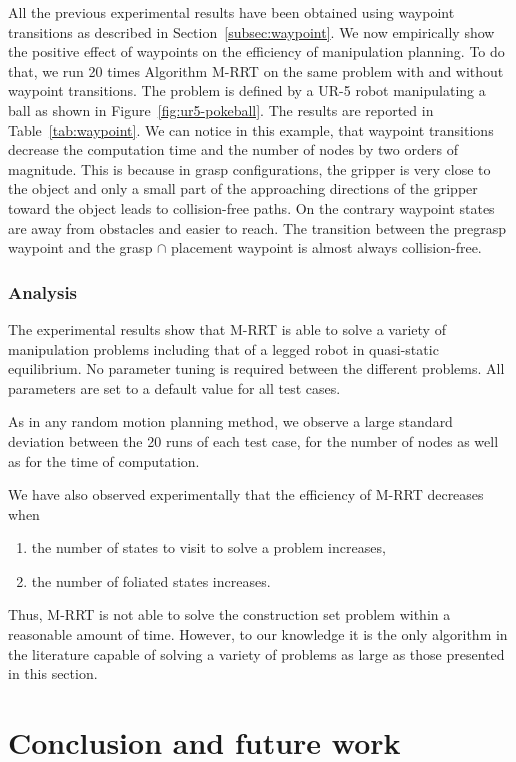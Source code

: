 All the previous experimental results have been obtained using
waypoint transitions as described in Section~\ref{subsec:waypoint}. We
now empirically show the positive effect of waypoints on the
efficiency of manipulation planning. To do that, we run 20 times
Algorithm M-RRT on the same problem with and without waypoint
transitions.  The problem is defined by a UR-5 robot manipulating a
ball as shown in Figure~\ref{fig:ur5-pokeball}. The results are
reported in Table~\ref{tab:waypoint}. We can notice in this
example, that waypoint transitions decrease the computation time and the
number of nodes by two orders of magnitude. This is because in grasp
configurations, the gripper is
very close to the object and only a small part of the approaching
directions of the gripper toward the object leads to collision-free
paths. On the contrary waypoint states are away from obstacles and
easier to reach. The transition between the pregrasp waypoint and the
grasp $\cap$ placement waypoint is {\color{blue}almost} always collision-free.

\subsubsection{Analysis}

The experimental results show that M-RRT is able to solve a variety of
manipulation problems including that of a legged robot in quasi-static
equilibrium. No parameter tuning is required between the different problems. All
parameters are set to a default value for all test cases.

As in any random motion planning method, we observe a large standard
deviation between the 20 runs of each test case, for the number of nodes
as well as for the time of computation.

We have also observed experimentally that the efficiency of M-RRT decreases
when
\begin{enumerate}
\item the number of states to visit to solve a problem increases,
\item the number of foliated states increases.
\end{enumerate}
Thus, M-RRT is not able to solve the construction set
problem within a reasonable amount of time. However, to our knowledge it is
the only algorithm in the literature capable of solving a variety of
problems as large as those presented in this section.

\section{Conclusion and future work}

